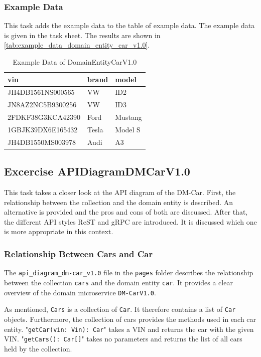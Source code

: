 \subsubsection*{Example Data}
This task adds the example data to the table of example data.
The example data is given in the task sheet.
The results are shown in \autoref{tab:example_data_domain_entity_car_v1.0}.
\begin{table}[H]
    \centering
    \begin{tabular}{|p{5cm}|p{2cm}|p{2cm}|}
        \hline
        vin & brand & model \\
        \hline
        JH4DB1561NS000565 & VW & ID2 \\
        JN8AZ2NC5B9300256 & VW & ID3 \\
        2FDKF38G3KCA42390 & Ford & Mustang \\
        1GBJK39DX6E165432 & Tesla & Model S \\
        JH4DB1550MS003978 & Audi & A3 \\
        \hline
    \end{tabular}
    \caption{Example Data of DomainEntityCarV1.0}
    \label{tab:example_data_domain_entity_car_v1.0}
\end{table}

\subsection{Excercise APIDiagramDMCarV1.0}
\label{subsec:api_diagram_dm_car_v1.0}
This task takes a closer look at the API diagram of the DM-Car.
First, the relationship between the collection and the domain entity is described.
An alternative is provided and the pros and cons of both are discussed.
After that, the different API styles ReST and gRPC are introduced.
It is discussed which one is more appropriate in this context.
\subsubsection*{Relationship Between Cars and Car}
The \texttt{api\_diagram\_dm-car\_v1.0} file in the \texttt{pages} folder describes the relationship between the collection \texttt{cars} and the domain entity \texttt{car}.
It provides a clear overview of the domain microservice \texttt{DM-CarV1.0}.

As mentioned, \texttt{Cars} is a collection of \texttt{Car}.
It therefore contains a list of \texttt{Car} objects.
Furthermore, the collection of cars provides the methods used in each car entity.
"\texttt{getCar(vin: Vin): Car}" takes a VIN and returns the car with the given VIN.
"\texttt{getCars(): Car[]}" takes no parameters and returns the list of all cars held by the collection.

